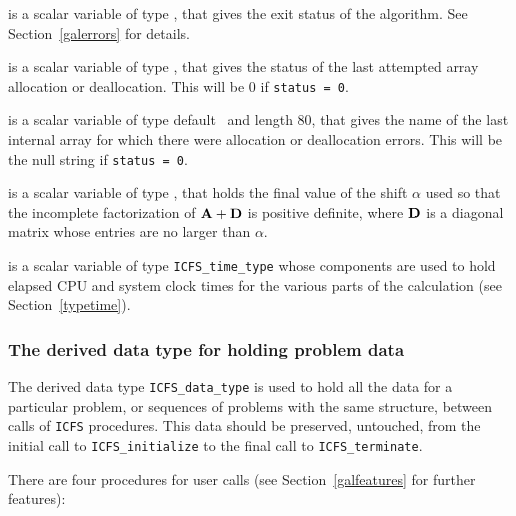 \documentclass{galahad}
\newcommand{\packagename}{ICFS}
\begin{document}
\begin{description}
 is a scalar variable of type \integer, that gives the
exit status of the algorithm.
See Section~\ref{galerrors} for details.

 is a scalar variable of type \integer, that gives
the status of the last attempted array allocation or deallocation.
This will be 0 if {\tt status = 0}.

 is a scalar variable of type default \character\
and length 80, that  gives the name of the last internal array
for which there were allocation or deallocation errors.
This will be the null string if {\tt status = 0}.

 is a scalar variable of type \realdp, that holds
the final value of the shift $\alpha$ used so that the incomplete
factorization of ${\mathbf{A}} + {\mathbf{D}}$ is positive definite, where ${\mathbf{D}}$ is
a diagonal matrix whose entries are no larger than $\alpha$.

 is a scalar variable of type {\tt \packagename\_time\_type}
whose components are used to hold elapsed CPU and system clock times for the
various parts of the calculation (see Section~\ref{typetime}).

\end{description}


\subsubsection{The derived data type for holding problem data}\label{typedata}
The derived data type
{\tt \packagename\_data\_type}
is used to hold all the data for a particular problem,
or sequences of problems with the same structure, between calls of
{\tt \packagename} procedures.
This data should be preserved, untouched,
from the initial call to
{\tt \packagename\_initialize}
to the final call to
{\tt \packagename\_terminate}.


\galarguments
There are four procedures for user calls
(see Section~\ref{galfeatures} for further features):
\end{document}
